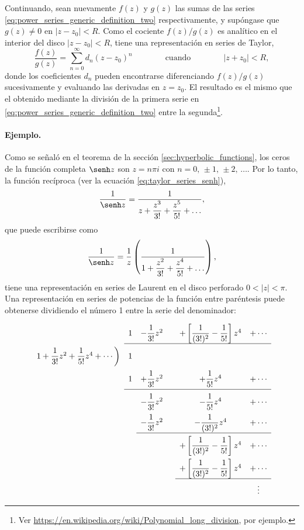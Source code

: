 \documentclass[a4paper]{report}
\begin{document}
Continuando, sean nuevamente \(f(z)\) y \(g(z)\) las sumas de las series \ref{eq:power_series_generic_definition_two} respectivamente, y supóngase que \(g(z)\neq0\) en \(|z-z_0|<R\). Como el cociente \(f(z)/g(z)\) es analítico en el interior del disco \(|z-z_0|<R\), tiene una representación en series de Taylor,
\[
 \frac{f(z)}{g(z)}=\sum_{n=0}^\infty d_n(z-z_0)^n
 \qquad\qquad\textrm{cuando}\qquad\qquad
 |z+z_0|<R,
\]
donde los coeficientes \(d_n\) pueden encontrarse diferenciando \(f(z)/g(z)\) sucesivamente y evaluando las derivadas en \(z=z_0\). El resultado es el mismo que el obtenido mediante la división de la primera serie en \ref{eq:power_series_generic_definition_two} entre la segunda\footnote{Ver \url{https://en.wikipedia.org/wiki/Polynomial_long_division}, por ejemplo.}. 

\paragraph{Ejemplo.} Como se señaló en el teorema de la sección \ref{sec:hyperbolic_functions}, los ceros de la función completa \(\senh z\) son \(z=n\pi i\) con \(n=0,\,\pm1,\,\pm2,\,\dots\). Por lo tanto, la función recíproca (ver la ecuación \ref{eq:taylor_series_senh}),
\[
 \frac{1}{\senh z}=\dfrac{1}{z+\dfrac{z^3}{3!}+\dfrac{z^5}{5!}+\dots},
\]
que puede escribirse como
\begin{equation}\label{eq:example_73_02_sinh}
 \frac{1}{\senh z}=\frac{1}{z}\left(\dfrac{1}{1+\dfrac{z^2}{3!}+\dfrac{z^4}{5!}+\dots}\right), 
\end{equation}
tiene una representación en series de Laurent en el disco perforado \(0<|z|<\pi\). Una representación en series de potencias de la función entre paréntesis puede obtenerse dividiendo el número 1 entre la serie del denominador:
\[
\setlength\extrarowheight{10pt}
\begin{array}[t]{cccccc}
                       & 1 & -\dfrac{1}{3!}z^2 & & +\left[\dfrac{1}{(3!)^2}-\dfrac{1}{5!}\right]z^4 & +\cdots\\[\medskipamount]
\cline{2-6}
1+\dfrac{1}{3!}z^2+
\dfrac{1}{5!}z^4+\cdots 
                \bigg) & 1  &  &  &   \\
                       & 1  & +\dfrac{1}{3!}z^2 &  & +\dfrac{1}{5!}z^4 & +\cdots \\[\medskipamount]
\cline{2-6}
                       &    & -\dfrac{1}{3!}z^2 &  & -\dfrac{1}{5!}z^4 & +\cdots \\
                       &    & -\dfrac{1}{3!}z^2 &  & -\dfrac{1}{(3!)^2}z^4 & +\cdots \\[\medskipamount]
\cline{3-6}
                       &    &                  &  & +\left[\dfrac{1}{(3!)^2}-\dfrac{1}{5!}\right]z^4 & +\cdots\\
                       &    &                  &  & +\left[\dfrac{1}{(3!)^2}-\dfrac{1}{5!}\right]z^4 & +\cdots\\[\medskipamount]
\cline{5-6}
                       &    &                  &  &  & \vdots\\
\end{array}
\]
\end{document}
